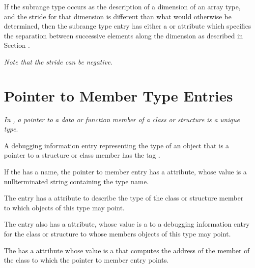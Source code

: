 If the subrange type occurs as the description of a dimension
of an array type, and the stride for that dimension 
is\hypertarget{chap:DWATbytestridesubrangestridedimensionofarraytype}{}
different than what would otherwise be determined, 
then\hypertarget{chap:DWATbitstridesubrangestridedimensionofarraytype}{}
the subrange type entry has either a
\DWATbytestrideDEFN{} or
\DWATbitstrideDEFN{} attribute 
which specifies the separation
between successive elements along the dimension as described in 
Section .

\textit{Note that the stride can be negative.}

\section{Pointer to Member Type Entries}
\label{chap:pointertomembertypeentries}

\textit{In , a 
pointer to a data or function member of a class or
structure is a unique type.}

A debugging information entry representing the type of an
object that is a pointer to a structure or class member has
the tag \DWTAGptrtomembertypeTARG.

If the  has a name, the 
pointer to member entry has a
\DWATname{} attribute, 
whose value is a
null\dash terminated string containing the type name.
\bbeb

The  entry 
has 
a \DWATtype{} attribute to
describe the type of the class or structure member to which
objects of this type may point.

The  entry 
also\hypertarget{chap:DWATcontainingtypecontainingtypeofpointertomembertype}{}
has a \DWATcontainingtypeDEFN{} attribute, 
whose value is a  to a debugging
information entry for the class or structure to whose members
objects of this type may point.

The\hypertarget{chap:DWATuselocationmemberlocationforpointertomembertype}{}
 has a 
\DWATuselocationDEFN{} attribute
whose value is a 
 that computes the
address of the member of the class to which the pointer to
member entry points.

